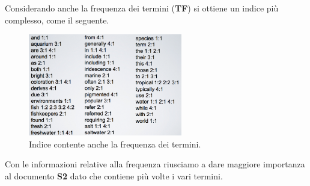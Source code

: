 Considerando anche la frequenza dei termini (\textbf{TF}) si ottiene un indice più complesso, come il seguente.

\begin{figure}[htbp]
	\centering
	\includegraphics[width=0.6\textwidth]{./images/l6-index-2}
	\caption{Indice contente anche la frequenza dei termini.}
\end{figure}

\noindent Con le informazioni relative alla frequenza riusciamo a dare maggiore importanza al documento \textbf{S2} dato che contiene più volte i vari termini.






